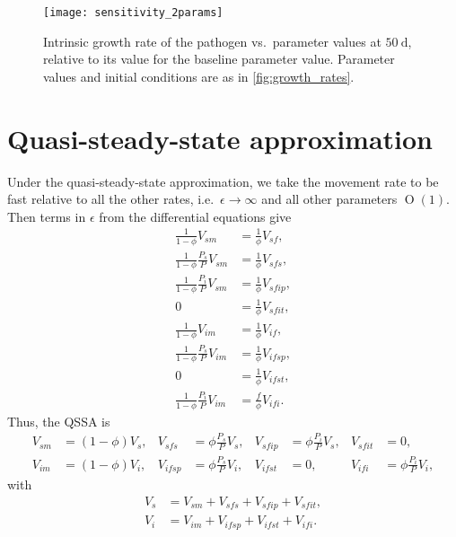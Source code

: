 \documentclass{article}
\begin{document}
\begin{figure}
  \centering
  \texttt{[image: sensitivity\_2params]}
  \caption{Intrinsic growth rate of the pathogen vs.~parameter values
    at $50~\text{d}$, relative to its value for the baseline
    parameter value.  Parameter values and
    initial conditions are as in \autoref{fig:growth_rates}.}
  \label{fig:sensitivity_2params}
\end{figure}


\clearpage
\appendix
\section{Quasi-steady-state approximation}
\label{sec:QSSA}

Under the quasi-steady-state approximation, we take the movement rate
to be fast relative to all the other rates, i.e.~$\epsilon \to \infty$
and all other parameters $\operatorname{O}(1)$.  Then terms in
$\epsilon$ from the differential equations give
\begin{equation}
  \begin{split}
    \frac{1}{1 - \phi} V_{sm} &=
    \frac{1}{\phi} V_{sf},
    \\
    \frac{1}{1 - \phi} \frac{P_s}{P} V_{sm} &=
    \frac{1}{\phi} V_{sfs},
    \\
    \frac{1}{1 - \phi} \frac{P_i}{P} V_{sm} &=
    \frac{1}{\phi} V_{sfip},
    \\
    0 &=
    \frac{1}{\phi} V_{sfit},
    \\
    \frac{1}{1 - \phi} V_{im} &=
    \frac{1}{\phi} V_{if},
    \\
    \frac{1}{1 - \phi} \frac{P_s}{P} V_{im} &= \frac{1}{\phi} V_{ifsp},
    \\
    0 &= \frac{1}{\phi} V_{ifst},
    \\
    \frac{1}{1 - \phi} \frac{P_i}{P} V_{im} &= \frac{f}{\phi} V_{ifi}.
  \end{split}
\end{equation}
Thus, the QSSA is
\begin{equation}
  \begin{aligned}
    V_{sm} &= (1 - \phi) V_s,
    &
    V_{sfs} &= \phi \frac{P_s}{P} V_s,
    &
    V_{sfip} &= \phi \frac{P_i}{P} V_s,
    &
    V_{sfit} &= 0,
    \\
    V_{im} &= (1 - \phi) V_i,
    &
    V_{ifsp} &= \phi \frac{P_s}{P} V_i,
    &
    V_{ifst} &= 0,
    &
    V_{ifi} &= \phi \frac{P_i}{P} V_i,
  \end{aligned}
\end{equation}
with
\begin{equation}
  \begin{split}
    V_s &= V_{sm} + V_{sfs} + V_{sfip} + V_{sfit}, \\
    V_i &= V_{im} + V_{ifsp} + V_{ifst} + V_{ifi}.
  \end{split}
\end{equation}
\end{document}
